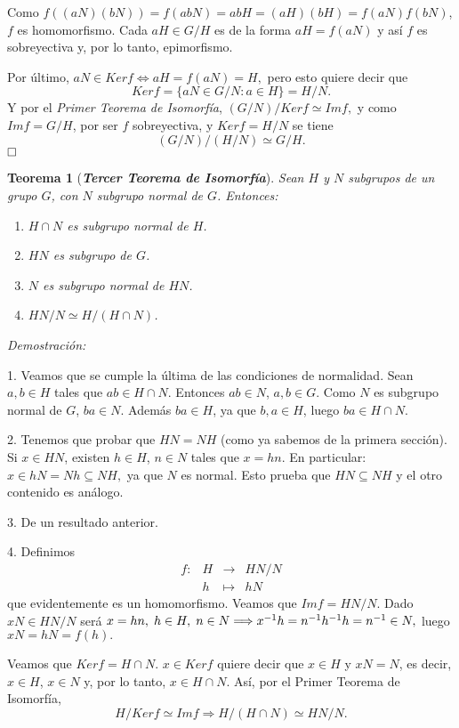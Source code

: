 \documentclass[12pt]{article}
\newtheorem{theorem}{Teorema}[section]
\begin{document}
Como $f((aN)(bN)) = f(abN) = abH = (aH)(bH) = f(aN)f(bN)$, $f$ es homomorfismo. Cada $aH \in G/H$ es de la forma $aH = f(aN)$ y así $f$ es sobreyectiva y, por lo tanto, epimorfismo.

Por último, $aN \in Ker f \Longleftrightarrow aH = f(aN) = H,$ pero esto quiere decir que $$Ker f = \lbrace aN \in G/N : a \in H\rbrace = H/N.$$ Y por el \textit{Primer Teorema de Isomorfía}, $(G/N)/Ker f \simeq Im f,$ y como $Im f = G/H$, por ser $f$ sobreyectiva, y $Ker f = H/N$ se tiene $$(G/N)/(H/N) \simeq G/H.$$
$\hfill \square$

\begin{theorem}[\textbf{\textit{Tercer Teorema de Isomorfía}}]
Sean $H$ y $N$ subgrupos de un grupo $G$, con $N$ subgrupo normal de $G$. Entonces:
\begin{enumerate}
\item $H \cap N$ es subgrupo normal de $H$.
\item $HN$ es subgrupo de $G$.
\item $N$ es subgrupo normal de $HN$.
\item $HN/N \simeq H/(H \cap N)$.
\end{enumerate}
\end{theorem}
\emph{Demostración: }

1. Veamos que se cumple la última de las condiciones de normalidad. Sean $a,b \in H$ tales que $ab \in H \cap N$. Entonces $ab \in N$, $a,b \in G$. Como $N$ es subgrupo normal de $G$, $ba \in N$. Además $ba \in H$, ya que $b, a \in H$, luego $ba \in H \cap N$.

2. Tenemos que probar que $HN = NH$ (como ya sabemos de la primera sección). Si $x \in HN$, existen $h \in H$, $n \in N$ tales que $x = hn$. En particular: $x \in hN = Nh \subseteq NH,$ ya que $N$ es normal. Esto prueba que $HN \subseteq NH$ y el otro contenido es análogo.

3. De un resultado anterior.

4. Definimos $$\begin{array}{rccl}
f\colon &H & \longrightarrow & HN/N\\
&h& \longmapsto &hN
\end{array}
$$ que evidentemente es un homomorfismo. Veamos que $Im f = HN/N$. Dado $xN \in HN/N$ será $x = hn, \hspace{0.1cm} h \in H, \hspace{0.1cm} n \in N\Longrightarrow x^{-1}h = n^{-1}h^{-1}h = n^{-1} \in N,$ luego $xN = hN = f(h).$

Veamos que $Ker f = H \cap N$. $x \in Ker f$ quiere decir que $x \in H$ y $xN = N$, es decir, $x \in H$, $x \in N$ y, por lo tanto, $x \in H \cap N$. Así, por el Primer Teorema de Isomorfía, $$H/Ker f \simeq Im f \Longrightarrow H/(H \cap N) \simeq HN/N.$$
\end{document}
